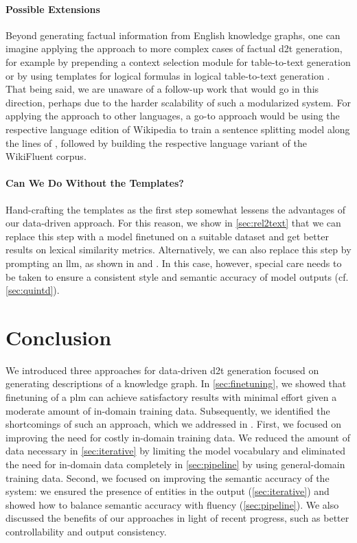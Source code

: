 \paragraph{Possible Extensions} Beyond generating factual information from English knowledge graphs, one can imagine applying the approach to more complex cases of factual \ac{d2t} generation, for example by prepending a context selection module for table-to-text generation \cite{parikhToTToControlledTableToText2020,chengHiTabHierarchicalTable2021} or by using templates for logical formulas in logical table-to-text generation \cite{chenLogicalNaturalLanguage2020,chenLogic2TextHighFidelityNatural2020}. That being said, we are unaware of a follow-up work that would go in this direction, perhaps due to the harder scalability of such a modularized system. For applying the approach to other languages, a go-to approach would be using the respective language edition of Wikipedia to train a sentence splitting model along the lines of \citet{botha-etal-2018-learning}, followed by building the respective language variant of the WikiFluent corpus.


\paragraph{Can We Do Without the Templates?} Hand-crafting the templates as the first step somewhat lessens the advantages of our data-driven approach. For this reason, we show in \autoref{sec:rel2text} that we can replace this step with a model finetuned on a suitable dataset and get better results on lexical similarity metrics. Alternatively, we can also replace this step by prompting an \ac{llm}, as shown in \citet{xiangASDOTAnyShotDatatoText2022} and \citet{sahaMURMURModularMultiStep2022}. In this case, however, special care needs to be taken to ensure a consistent style and semantic accuracy of model outputs (cf. \autoref{sec:quintd}).



\section{Conclusion}
We introduced three approaches for data-driven \ac{d2t} generation focused on generating descriptions of a knowledge graph. In \autoref{sec:finetuning}, we showed that finetuning of a \ac{plm} can achieve satisfactory results with minimal effort given a moderate amount of in-domain training data. Subsequently, we identified the shortcomings of such an approach, which we addressed in . First, we focused on improving the need for costly in-domain training data. We reduced the amount of data necessary in \autoref{sec:iterative} by limiting the model vocabulary and eliminated the need for in-domain data completely in \autoref{sec:pipeline} by using general-domain training data. Second, we focused on improving the semantic accuracy of the system: we ensured the presence of entities in the output (\autoref{sec:iterative}) and showed how to balance semantic accuracy with fluency (\autoref{sec:pipeline}). We also discussed the benefits of our approaches in light of recent progress, such as better controllability and output consistency.